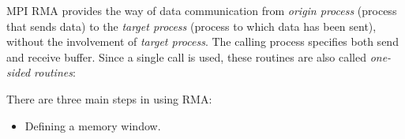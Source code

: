 \documentclass[12pt]{article}
\begin{document}
MPI RMA provides the way of data communication from \textit{origin process} (process that sends data) to the \textit{target
process} (process to which data has been sent), without the involvement of \textit{target process}. The calling process specifies
both send and receive buffer. Since a single call is used, these routines are also called \textit{one-sided routines}:

There are three main steps in using RMA:
\begin{itemize}
    \item Defining a memory window.
\end{itemize}
\end{document}
